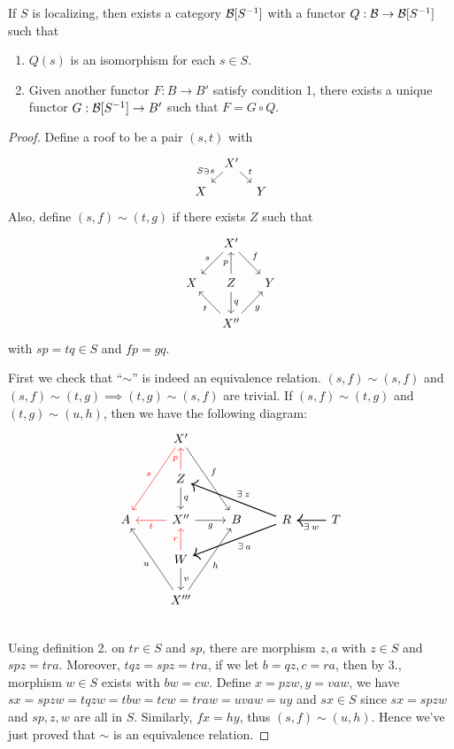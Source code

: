 \begin{theorem}
  If $S$ is localizing, then exists a category $\mathcal{B}[S^{-1}]$ with
  a functor $Q : \mathcal{B} \to \mathcal{B}[S^{-1}]$ such that
  \begin{enumerate}
    \item $Q(s)$ is an isomorphism for each $s \in S$.
    \item Given another functor $F : B \to B'$ satisfy condition 1, there exists
      a unique functor $G : \mathcal{B}[S^{-1}] \to B'$ such that $F = G \circ Q$.
  \end{enumerate}
  \begin{proof}
    Define a roof to be a pair $(s, t)$ with
    \[ \begin{tikzcd}[column sep=tiny, row sep=small]
        & X' \ar[ld, "S \ni s"'] \ar[rd, "t"] & \\
      X & & Y
    \end{tikzcd} \]
  Also, define $(s, f) \sim (t, g)$ if there exists $Z$ such that
  \[ \begin{tikzcd}[column sep=small]
        & X' \ar[ld, "s"'] \ar[rd, "f"] & \\
        X & Z \ar[u, "p"] \ar[d, "q"] & Y \\
        & X'' \ar[lu, "t"] \ar[ru, "g"']  &
    \end{tikzcd} \]
  with $sp = tq \in S$ and $fp = gq$.

  First we check that ``$\sim$'' is indeed an equivalence relation.
  $(s, f) \sim (s, f)$ and $(s, f) \sim (t, g) \implies (t, g) \sim (s, f)$
  are trivial. If $(s, f) \sim (t, g)$ and $(t, g) \sim (u, h)$, then
  we have the following diagram:
  \[
    \begin{tikzcd}
      & X' \ar[ldd, "s"', red] \ar[rdd, "f"] & & & \\
      & Z \ar[u, "p", red] \ar[d, "q"] & & & \\
      A & X'' \ar[l, "t", red] \ar[r, "g"'] & B &
      R \ar[llu, "\exists z"', thick] \ar[lld, "\exists a", thick] & T \ar[l, "\exists w", thick] \\
      & W \ar[u, "r", red] \ar[d, "v"] & & & \\
      & X''' \ar[luu, "u"] \ar[ruu, "h"'] & & & \\
    \end{tikzcd}
  \]
  Using definition 2. on $tr \in S$ and $sp$, there are morphism $z, a$
  with $z \in S$ and $spz = tra$. Moreover, $tqz = spz = tra$,
  if we let $b = qz, c = ra$, then by 3., morphism $w \in S$ exists
  with $bw = cw$. Define $x = pzw, y = vaw$,
  we have $sx = spzw = tqzw = tbw = tcw = traw = uvaw = uy$
  and $sx \in S$ since $sx = spzw$ and $sp, z, w$ are all in $S$.
  Similarly, $fx = hy$, thus $(s, f) \sim (u, h)$.
  Hence we've just proved that $\sim$ is an equivalence relation.


\end{proof}
\end{theorem}
